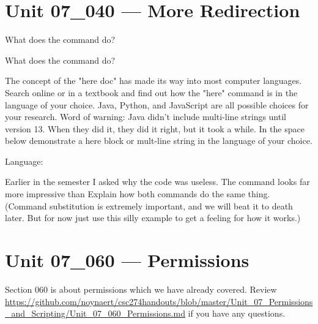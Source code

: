 \documentclass[letterpaper,12pt]{exam}
\newcommand{\unit}{Unit 07}
\begin{document}
\begin {questions}
\begin{samepage}
\end{samepage}

\section*{\unit\_040 --- More Redirection} %

\begin{samepage}
\question What does the  command do?  
\vspace{5mm}
\end{samepage}

\begin{samepage}
\question What does the  command do? 
\vspace{5mm}
\end{samepage}

\begin{samepage}
\question The concept of the "here doc" has made its way into most computer languages.  Search online or in a textbook and find out how the "here" command is in the language of your choice.  Java, Python, and JavaScript are all possible choices for your research.  Word of warning:  Java didn't include multi-line strings until version 13.  When they did it, they did it right, but it took a while.  In the space below demonstrate a here block or mult-line string in the language of your choice.

Language: {\color{blue}\fillin[][2cm]}
\vspace{25mm}
\end{samepage}

\begin{samepage}
\question Earlier in the semester I asked why the code  was useless.  The command  looks far more impressive than  Explain how both commands do the same thing. (Command substitution is extremely important, and we will beat it to death later.  But for now just use this silly example to get a feeling for how it works.)
\vspace{5mm}
\end{samepage}


\section*{\unit\_060 --- Permissions}

Section 060 is about permissions which we have already covered.  Review \url{https://github.com/noynaert/csc274handouts/blob/master/Unit_07_Permissions_and_Scripting/Unit_07_060_Permissions.md} if you have any questions. 


\end{questions}
\end{document}
